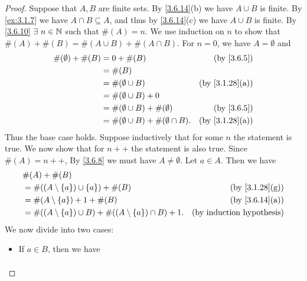 \begin{proof}
  Suppose that \(A, B\) are finite sets.
  By \cref{3.6.14}(b) we have \(A \cup B\) is finite.
  By \cref{ex:3.1.7} we have \(A \cap B \subseteq A\), and thus by \cref{3.6.14}(c) we have \(A \cup B\) is finite.
  By \cref{3.6.10} \(\exists\ n \in \N\) such that \(\#(A) = n\).
  We use induction on \(n\) to show that \(\#(A) + \#(B) = \#(A \cup B) + \#(A \cap B)\).
  For \(n = 0\), we have \(A = \emptyset\) and
  \begin{align*}
    \#(\emptyset) + \#(B) & = 0 + \#(B)                                    & \text{(by \cref{3.6.5})}     \\
                          & = \#(B)                                                                       \\
                          & = \#(\emptyset \cup B)                         & \text{(by \cref{3.1.28}(a))} \\
                          & = \#(\emptyset \cup B) + 0                                                    \\
                          & = \#(\emptyset \cup B) + \#(\emptyset)         & \text{(by \cref{3.6.5})}     \\
                          & = \#(\emptyset \cup B) + \#(\emptyset \cap B). & \text{(by \cref{3.1.28}(a))}
  \end{align*}
  Thus the base case holds.
  Suppose inductively that for some \(n\) the statement is true.
  We now show that for \(n++\) the statement is also true.
  Since \(\#(A) = n++\), By \cref{3.6.8} we must have \(A \neq \emptyset\).
  Let \(a \in A\).
  Then we have
  \begin{align*}
     & \#(A) + \#(B)                                                                                             \\
     & = \#((A \setminus \{a\}) \cup \{a\}) + \#(B)                           & \text{(by \cref{3.1.28}(g))}     \\
     & = \#(A \setminus \{a\}) + 1 + \#(B)                                    & \text{(by \cref{3.6.14}(a))}     \\
     & = \#((A \setminus \{a\}) \cup B) + \#((A \setminus \{a\}) \cap B) + 1. & \text{(by induction hypothesis)}
  \end{align*}
  We now divide into two cases:
  \begin{itemize}
    \item If \(a \in B\), then we have
          \begin{align*}

\end{align*}
\end{itemize}
\end{proof}
